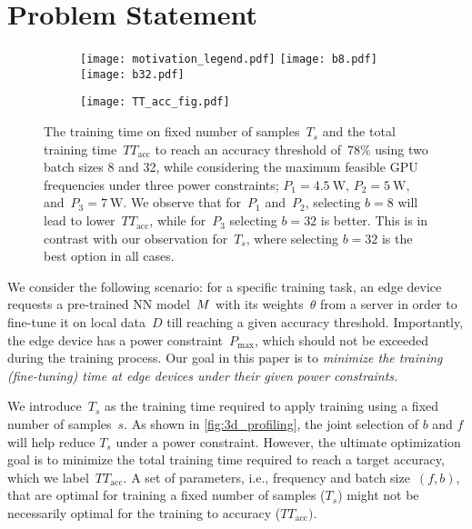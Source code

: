 \section{Problem Statement}
\label{sec:problem_statement}


\begin{figure*}[tb!]
    \begin{subfigure}[b]{0.35\textwidth}
        \centering
        \texttt{[image: motivation\_legend.pdf]}
        \texttt{[image: b8.pdf]}
        \texttt{[image: b32.pdf]}
        
    \end{subfigure}
    \hspace{6mm}
    \begin{subfigure}[b]{0.46\textwidth}
        \texttt{[image: TT\_acc\_fig.pdf]}
    \end{subfigure}

    \caption{The training time on fixed number of samples~$T_s$ and the total training time~$TT_\text{acc}$ to reach an accuracy threshold of~$78\%$ using two batch sizes 8 and 32, while considering the maximum feasible GPU frequencies under three power constraints; $P_1=\SI{4.5}{\watt}$, $P_2=\SI{5}{\watt}$, and~$P_3=\SI{7}{\watt}$. We observe that for~$P_1$ and~$P_2$, selecting $b=8$ will lead to lower~$TT_\text{acc}$, while for~$P_3$ selecting $b=32$ is better. This is in contrast with our observation for~$T_s$, where selecting $b=32$ is the best option in all cases.}
    \label{fig:b8_b32_power_constraint}
\end{figure*}

We consider the following scenario: for a specific training task, an edge device requests a pre-trained \ac{NN} model~$M$ with its weights~$\theta$ from a server in order to fine-tune it on local data~$D$ till reaching a given accuracy threshold. 
Importantly, the edge device has a power constraint~$P_{\text{max}}$, which should not be exceeded during the training process. 
Our goal in this paper is to \textit{minimize the training (fine-tuning) time at edge devices under their given power constraints.} 



 We introduce~$T_s$ as the training time required to apply training using a fixed number of samples~$s$. As shown in \cref{fig:3d_profiling}, the joint selection of $b$ and $f$ will help reduce $T_s$  under a power constraint. However, the ultimate optimization goal is to minimize the total training time required to reach a target accuracy, which we label~$TT_{\text{acc}}$.
A set of parameters, i.e., frequency and batch size~$(f,b)$, that are optimal for training a fixed number of samples ($T_s$) might not be necessarily optimal for the training to accuracy ($TT_{\text{acc}})$.

